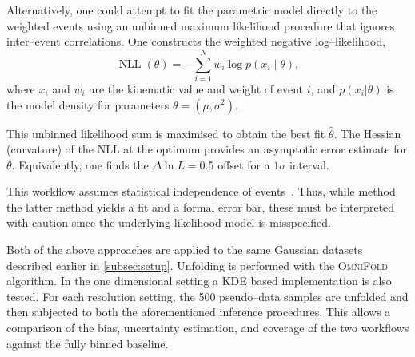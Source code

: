         Alternatively, one could attempt to fit the parametric model directly to the weighted events using an unbinned maximum likelihood procedure that ignores inter--event correlations.
        One constructs the weighted negative log--likelihood,
        \[
            \operatorname{NLL}(\theta) = -\sum_{i=1}^N w_i \log p(x_i \mid \theta),
        \]
        where $x_i$ and $w_i$ are the kinematic value and weight of event $i$, and $p(x_i|\theta)$ is the model density for parameters $\theta=(\mu,\sigma^2)$.
        
        This unbinned likelihood sum is maximised to obtain the best fit $\hat\theta$.
        The Hessian (curvature) of the NLL at the optimum provides an asymptotic error estimate for $\theta$.
        Equivalently, one finds the $\Delta\ln L=0.5$ offset for a $1\sigma$ interval.
        
        This workflow assumes statistical independence of events~\cite{cowan_survey_2002, Blobel:2011fih, Blobel2013Unfolding}.
        Thus, while method the latter method yields a fit and a formal error bar, these must be interpreted with caution since the underlying likelihood model is misspecified.
    
        Both of the above approaches are applied to the same Gaussian datasets described earlier in \cref{subsec:setup}.
        Unfolding is performed with the \textsc{OmniFold} algorithm.
        In the one dimensional setting a KDE based implementation is also tested.
        For each resolution setting, the 500 pseudo--data samples are unfolded and then subjected to both the aforementioned inference procedures.
        This allows a comparison of the bias, uncertainty estimation, and coverage of the two workflows against the fully binned baseline.
